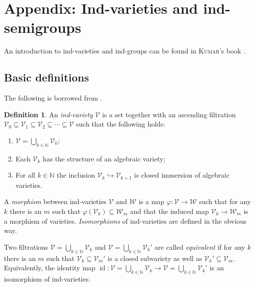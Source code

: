 \documentclass{amsart}
\theoremstyle{definition}
\newtheorem{defn}[thm]{Definition}
\theoremstyle{remark}
\begin{document}
{\par\medskip}
\section*{Appendix: Ind-varieties and ind-semigroups}
An introduction to ind-varieties and ind-groups can be found in {\textsc{{Kumar}\/}}'s book \cite[Chapter IV]{Ku2002Kac-Moody-groups-t}.
\subsection{Basic definitions} 
The following is borrowed from \cite{FuKr2015On-the-geometry-of}.

\begin{defn}\label{indvar.def}
An {\it ind-variety} ${\mathcal V}$ is a set together with an ascending filtration ${\mathcal V}_{0}{\subseteq} {\mathcal V}_{1}{\subseteq} {\mathcal V}_{2}{\subseteq} \cdots{\subseteq} {\mathcal V}$ such that the following holds:
\begin{enumerate}
\item ${\mathcal V} = \bigcup_{k \in {\mathbb N}}{\mathcal V}_{k}$;
\item Each ${\mathcal V}_{k}$ has the structure of an algebraic variety;
\item For all $k \in {\mathbb N}$ the inclusion  ${\mathcal V}_{k}{\hookrightarrow} {\mathcal V}_{k+1}$ is closed immersion of algebraic varieties.
\end{enumerate}
\end{defn}

A {\it morphism} between ind-varieties ${\mathcal V}$ and ${\mathcal W}$  is a map ${\varphi}\colon {\mathcal V} \to {\mathcal W}$  such that for any $k$ there is an $m$ such that ${\varphi}({\mathcal V}_{k}) {\subseteq} {\mathcal W}_{m}$ and that the induced map ${\mathcal V}_{k}\to {\mathcal W}_{m}$ is a morphism of varieties. {\it Isomorphisms} of ind-varieties are defined in the obvious way.

Two filtrations ${\mathcal V} = \bigcup_{k \in {\mathbb N}} {\mathcal V}_{k}$ and ${\mathcal V} = \bigcup_{k \in {\mathbb N}} {\mathcal V}_{k}'$ are called {\it equivalent\/} if for any $k$ there is an $m$ such that ${\mathcal V}_{k}{\subseteq} {\mathcal V}_{m}'$ is a closed subvariety as well as ${\mathcal V}_{k}'{\subseteq} {\mathcal V}_{m}$. Equivalently,  the identity map $\operatorname{id} \colon {\mathcal V} = \bigcup_{k \in {\mathbb N}} {\mathcal V}_{k} \to {\mathcal V} = \bigcup_{k \in {\mathbb N}} {\mathcal V}_{k}'$ is an isomorphism of ind-varieties.
\end{document}
